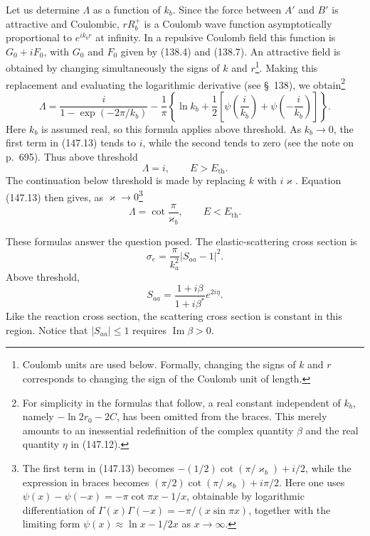 Let us determine $\Lambda$ as a function of $k_b$. Since the force between $A'$ and $B'$ is attractive and Coulombic, $rR_b^+$ is a Coulomb wave function asymptotically proportional to $e^{ik_br}$ at infinity. In a repulsive Coulomb field this function is $G_0+iF_0$, with $G_0$ and $F_0$ given by (138.4) and (138.7). An attractive field is obtained by changing simultaneously the signs of $k$ and $r$\footnote{Coulomb units are used below. Formally, changing the signs of $k$ and $r$ corresponds to changing the sign of the Coulomb unit of length.}. Making this replacement and evaluating the logarithmic derivative (see \S~138), we obtain\footnote{For simplicity in the formulas that follow, a real constant independent of $k_b$, namely $-\ln2r_0-2C$, has been omitted from the braces. This merely amounts to an inessential redefinition of the complex quantity $\beta$ and the real quantity $\eta$ in (147.12).}
\begin{equation}
 \Lambda=\frac{i}{1-\exp(-2\pi/k_b)}-\frac1\pi
 \left\{\ln k_b+\frac12\left[\psi\left(\frac{i}{k_b}\right)+
 \psi\left(-\frac{i}{k_b}\right)\right]\right\}.
 \tag{147.13}
\end{equation}
Here $k_b$ is assumed real, so this formula applies above threshold. As $k_b\to0$, the first term in (147.13) tends to $i$, while the second tends to zero (see the note on p.~695). Thus above threshold
\begin{equation}
 \Lambda=i,\qquad E>E_{\mathrm{th}}.
 \tag{147.14}
\end{equation}
The continuation below threshold is made by replacing $k$ with $i\varkappa$. Equation (147.13) then gives, as $\varkappa\to0$\footnote{The first term in (147.13) becomes $-(1/2)\cot(\pi/\varkappa_b)+i/2$, while the expression in braces becomes $(\pi/2)\cot(\pi/\varkappa_b)+i\pi/2$. Here one uses $\psi(x)-\psi(-x)=-\pi\cot\pi x-1/x$, obtainable by logarithmic differentiation of $\Gamma(x)\Gamma(-x)=-\pi/(x\sin\pi x)$, together with the limiting form $\psi(x)\approx\ln x-1/2x$ as $x\to\infty$.}
\begin{equation}
 \Lambda=\cot\frac\pi{\varkappa_b},\qquad E<E_{\mathrm{th}}.
 \tag{147.15}
\end{equation}

These formulas answer the question posed. The elastic-scattering cross section is
\[
 \sigma_e=\frac\pi{k_a^2}|S_{aa}-1|^2.
\]
Above threshold,
\begin{equation}
 S_{aa}=\frac{1+i\beta}{1+i\beta^*}e^{2i\eta}.
 \tag{147.16}
\end{equation}
Like the reaction cross section, the scattering cross section is constant in this region. Notice that $|S_{aa}|\leq1$ requires $\operatorname{Im}\beta>0$.


